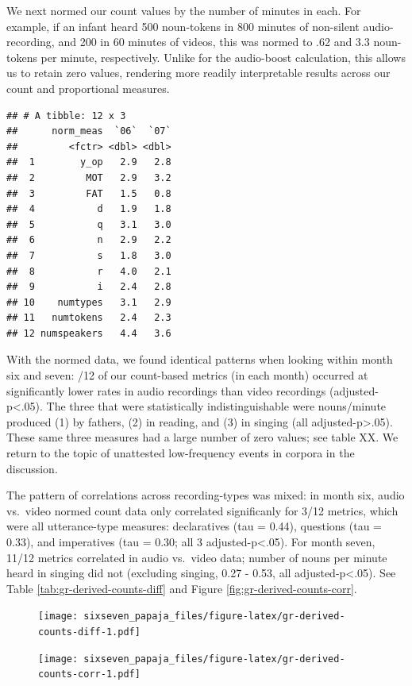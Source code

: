 \documentclass[floatsintext,man]{apa6}
\theoremstyle{definition}
\theoremstyle{definition}
\theoremstyle{definition}
\theoremstyle{remark}
\begin{document}
We next normed our count values by the number of minutes in each. For
example, if an infant heard 500 noun-tokens in 800 minutes of non-silent
audio-recording, and 200 in 60 minutes of videos, this was normed to .62
and 3.3 noun-tokens per minute, respectively. Unlike for the audio-boost
calculation, this allows us to retain zero values, rendering more
readily interpretable results across our count and proportional
measures.

\begin{verbatim}
## # A tibble: 12 x 3
##      norm_meas  `06`  `07`
##         <fctr> <dbl> <dbl>
##  1        y_op   2.9   2.8
##  2         MOT   2.9   3.2
##  3         FAT   1.5   0.8
##  4           d   1.9   1.8
##  5           q   3.1   3.0
##  6           n   2.9   2.2
##  7           s   1.8   3.0
##  8           r   4.0   2.1
##  9           i   2.4   2.8
## 10    numtypes   3.1   2.9
## 11   numtokens   2.4   2.3
## 12 numspeakers   4.4   3.6
\end{verbatim}

With the normed data, we found identical patterns when looking within
month six and seven: /12 of our count-based metrics (in each month)
occurred at significantly lower rates in audio recordings than video
recordings (adjusted-p\textless{}.05). The three that were statistically
indistinguishable were nouns/minute produced (1) by fathers, (2) in
reading, and (3) in singing (all adjusted-p\textgreater{}.05). These
same three measures had a large number of zero values; see table XX. We
return to the topic of unattested low-frequency events in corpora in the
discussion.

The pattern of correlations across recording-types was mixed: in month
six, audio vs.~video normed count data only correlated significanly for
3/12 metrics, which were all utterance-type measures: declaratives (tau
= 0.44), questions (tau = 0.33), and imperatives (tau = 0.30; all 3
adjusted-p\textless{}.05). For month seven, 11/12 metrics correlated in
audio vs.~video data; number of nouns per minute heard in singing did
not (excluding singing, 0.27 - 0.53, all adjusted-p\textless{}.05). See
Table \ref{tab:gr-derived-counts-diff} and Figure
\ref{fig:gr-derived-counts-corr}.

\begin{figure}[htbp]
\centering
\texttt{[image: sixseven\_papaja\_files/figure-latex/gr-derived-counts-diff-1.pdf]}
\caption{}
\end{figure}

\begin{figure}[htbp]
\centering
\texttt{[image: sixseven\_papaja\_files/figure-latex/gr-derived-counts-corr-1.pdf]}
\caption{}
\end{figure}
\end{document}
